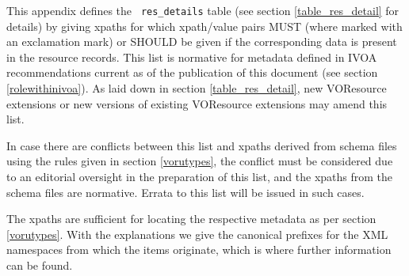 \documentclass[11pt,a4paper]{ivoa}
\newcommand{\rtent}[1]{\texttt{\color{rtcolor} #1}}
\begin{document}
This appendix defines the \rtent{res\_details}
table (see section \ref{table_res_detail} for
details) by giving
xpaths for which xpath/value pairs MUST (where marked with an
exclamation mark) or SHOULD be given if the
corresponding data is present in the resource records.  This list is
normative for metadata defined in IVOA recommendations current as of the
publication of this document (see section \ref{rolewithinivoa}).  
As laid down in section \ref{table_res_detail}, 
new VOResource extensions or new
versions of existing VOResource extensions may amend this list.

In case there are conflicts between this list and xpaths derived 
from schema files using the rules given in section \ref{vorutypes}, the conflict must be considered due to an
editorial oversight in the preparation of this list, and the xpaths from the
schema files are normative.  Errata to this list will be issued in such
cases.

The xpaths are sufficient for locating the respective metadata as per
section \ref{vorutypes}.  With the explanations we
give the canonical prefixes for the XML namespaces from which the items
originate, which is where further information can be found.
\end{document}
